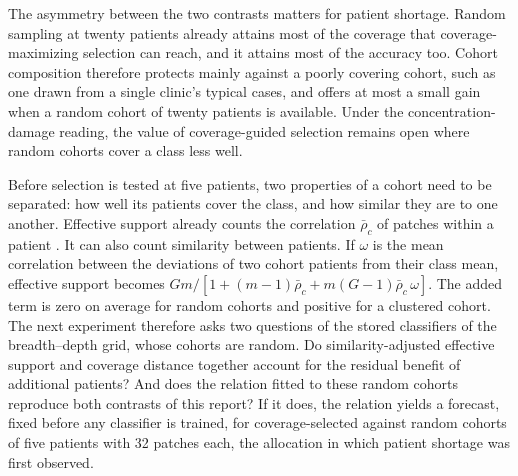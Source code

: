 The asymmetry between the two contrasts matters for patient shortage. Random sampling at twenty patients already attains most of the coverage that coverage-maximizing selection can reach, and it attains most of the accuracy too. Cohort composition therefore protects mainly against a poorly covering cohort, such as one drawn from a single clinic's typical cases, and offers at most a small gain when a random cohort of twenty patients is available. Under the concentration-damage reading, the value of coverage-guided selection remains open where random cohorts cover a class less well.

Before selection is tested at five patients, two properties of a cohort need to be separated: how well its patients cover the class, and how similar they are to one another. Effective support already counts the correlation $\bar\rho_c$ of patches within a patient \citep{queisler2026multidirectionalRedundancy}. It can also count similarity between patients. If $\omega$ is the mean correlation between the deviations of two cohort patients from their class mean, effective support becomes $Gm/[1+(m-1)\bar\rho_c+m(G-1)\bar\rho_c\,\omega]$. The added term is zero on average for random cohorts and positive for a clustered cohort. The next experiment therefore asks two questions of the stored classifiers of the breadth--depth grid, whose cohorts are random. Do similarity-adjusted effective support and coverage distance together account for the residual benefit of additional patients? And does the relation fitted to these random cohorts reproduce both contrasts of this report? If it does, the relation yields a forecast, fixed before any classifier is trained, for coverage-selected against random cohorts of five patients with 32 patches each, the allocation in which patient shortage was first observed.
